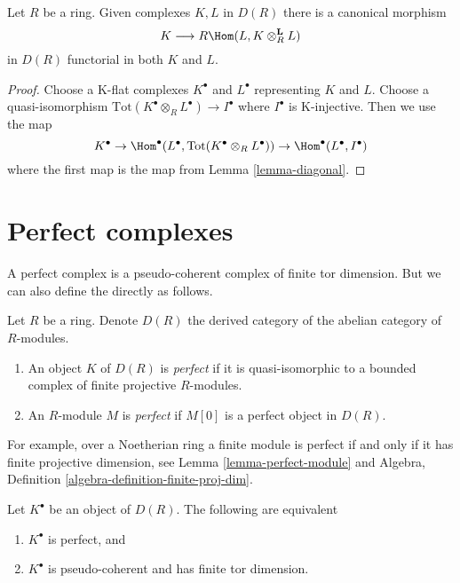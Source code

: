 \begin{lemma}
\label{lemma-internal-hom-diagonal}
Let $R$ be a ring. Given complexes $K, L$ in $D(R)$
there is a canonical morphism
$$
K \longrightarrow R\Hom(L, K \otimes_R^\mathbf{L} L)
$$
in $D(R)$ functorial in both $K$ and $L$.
\end{lemma}

\begin{proof}
Choose a K-flat complexes $K^\bullet$ and $L^\bullet$ representing $K$
and $L$. Choose a quasi-isomorphism
$\text{Tot}(K^\bullet \otimes_R L^\bullet) \to I^\bullet$
where $I^\bullet$ is K-injective. Then we use the map
$$
K^\bullet \to
\Hom^\bullet(L^\bullet, \text{Tot}(K^\bullet \otimes_R L^\bullet))
\to \Hom^\bullet(L^\bullet, I^\bullet)
$$
where the first map is the map from Lemma \ref{lemma-diagonal}.
\end{proof}









\section{Perfect complexes}
\label{section-perfect}

\noindent
A perfect complex is a pseudo-coherent complex of finite tor dimension.
But we can also define the directly as follows.

\begin{definition}
\label{definition-perfect}
Let $R$ be a ring. Denote $D(R)$ the derived category of the abelian
category of $R$-modules.
\begin{enumerate}
\item An object $K$ of $D(R)$ is {\it perfect} if it is quasi-isomorphic
to a bounded complex of finite projective $R$-modules.
\item An $R$-module $M$ is {\it perfect} if $M[0]$ is a perfect object
in $D(R)$.
\end{enumerate}
\end{definition}

\noindent
For example, over a Noetherian ring a finite module is perfect if and
only if it has finite projective dimension, see
Lemma \ref{lemma-perfect-module}
and Algebra, Definition \ref{algebra-definition-finite-proj-dim}.

\begin{lemma}
\label{lemma-perfect}
Let $K^\bullet$ be an object of $D(R)$. The following are equivalent
\begin{enumerate}
\item $K^\bullet$ is perfect, and
\item $K^\bullet$ is pseudo-coherent and has finite tor dimension.
\end{enumerate}
\end{lemma}

